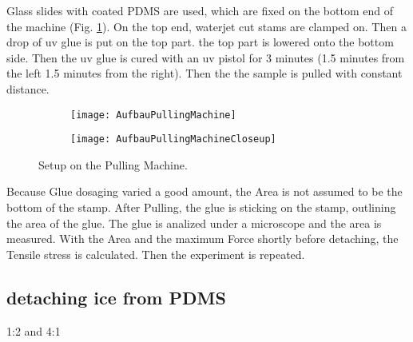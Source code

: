 Glass slides with coated PDMS are used, which are fixed on the bottom end of the machine (Fig. \ref{fig:PullingMachineSetup}). On the top end, waterjet cut stams are clamped on. Then a drop of uv glue is put on the top part. the top part is lowered onto the bottom side. Then the uv glue is cured with an uv pistol for 3 minutes (1.5 minutes from the left 1.5 minutes from the right). Then the the sample is pulled with constant distance.

\begin{figure}[hbt!]
	\centering
	\begin{subfigure}[]{0.45\textwidth}
		\centering
		\texttt{[image: AufbauPullingMachine]}
		\caption{}
	\end{subfigure}
	\begin{subfigure}[]{0.45\textwidth}
		\centering
		\texttt{[image: AufbauPullingMachineCloseup]}
		\caption{}
	\end{subfigure}
	\caption{Setup on the Pulling Machine.}
	\label{fig:PullingMachineSetup}
\end{figure}

Because Glue dosaging varied a good amount, the Area is not assumed to be the bottom of the stamp. After Pulling, the glue is sticking on the stamp, outlining the area of the glue. The glue is analized under a microscope and the area is measured. With the Area and the maximum Force shortly before detaching, the Tensile stress is calculated. Then the experiment is repeated.



\subsection{detaching ice from PDMS}

1:2 and 4:1

